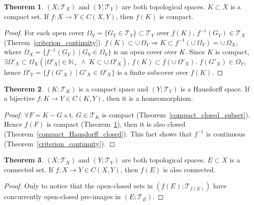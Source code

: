\documentclass{article}
\theoremstyle{plain}
\theoremstyle{definition}
\newtheorem{thrm}{Theorem}[section] %
\begin{document}
\begin{thrm}\label{compact_continuous}
$(X;\mathscr{T}_X)$ and $(Y;\mathscr{T}_Y)$ are both topological spaces. $K\subset X$ is a compact set. If $f: X\to Y \in C( X, Y)$, then $f( K)$ is compact.
\end{thrm}
\begin{proof}
For each open cover $\Omega_Y = \{ G_Y \in \mathscr{T}_Y\} \subset \mathscr{T}_Y$ over $f( K)$, $f ^{-1} ( G_Y) \in \mathscr{T}_X$ (Therem~\ref{criterion_continuity}). $f( K) \subset \cup\,\Omega_Y \Rightarrow K \subset f ^{-1} \left(  \cup\,\Omega_Y \right) = \cup\,\Omega_X $, where $\Omega_X = \{ f ^{-1} ( G_Y) \mid G_Y \in \Omega_Y\} $ is an open cover over $K$. Since $K$ is compact,
$\exists \Omega'_X \subset \Omega_X\left( 
\lvert \Omega'_X \rvert \in \mathbb{N}_+ 
\;\wedge\;K\subset \cup\,\Omega'_X
\right)$, $f( K) \subset f ( \cup\,\Omega'_X) $. $f ( G'_X) \in \Omega_Y$, hence $\Omega'_Y = \{ f ( G'_X) \mid G'_X \in \Omega'_X\}$ is a finite subcover over $f( K)$.
\end{proof}
\begin{thrm}\label{compact_Hausdorff_continuous_homeomorphism}
$(K;\mathscr{T}_K)$ is a compact space and $(Y;\mathscr{T}_Y)$ is a Hausdorff space. If a bijective $f: K\to Y \in C( K, Y)$, then it is a homeomorphism.
\end{thrm}
\begin{proof}
$\forall F = K - G$ s.t. $G \in \mathscr{T}_K$ is compact (Theorem~\ref{compact_closed_subset}). Hence $f ( F) $ is compact (Theorem~\ref{compact_continuous}), then it is also closed
(Theorem~\ref{compact_Hausdorff_closed}). This fact shows that $f ^{-1}$ is continuous (Theorem~\ref{criterion_continuity}).
\end{proof}
\begin{thrm}\label{connected_continuous}
$(X;\mathscr{T}_X)$ and $(Y;\mathscr{T}_Y)$ are both topological spaces. $E\subset X$ is a connected set. If $f: X\to Y \in C( X, Y)$, then $f( E)$ is also connected.
\end{thrm}
\begin{proof}
Only to notice that the open-closed sets in $( f( E) ; \mathscr{T}_{ f( E)})$ have concurrently open-closed pre-images in $( E; \mathscr{T}_E)$.
\end{proof}
\end{document}
